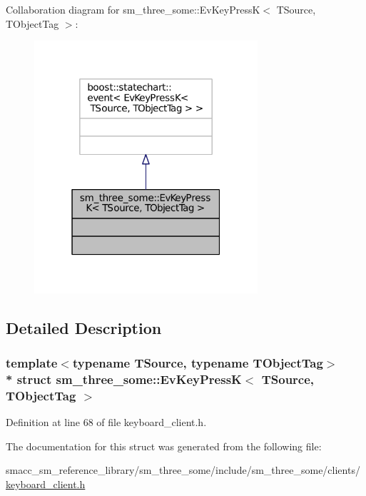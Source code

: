 Collaboration diagram for sm\+\_\+three\+\_\+some\+:\+:Ev\+Key\+PressK$<$ T\+Source, T\+Object\+Tag $>$\+:
\nopagebreak
\begin{figure}[H]
\begin{center}
\leavevmode
\includegraphics[width=235pt]{structsm__three__some_1_1EvKeyPressK__coll__graph}
\end{center}
\end{figure}


\subsection{Detailed Description}
\subsubsection*{template$<$typename T\+Source, typename T\+Object\+Tag$>$\\*
struct sm\+\_\+three\+\_\+some\+::\+Ev\+Key\+Press\+K$<$ T\+Source, T\+Object\+Tag $>$}



Definition at line 68 of file keyboard\+\_\+client.\+h.



The documentation for this struct was generated from the following file\+:\begin{DoxyCompactItemize}
\item 
smacc\+\_\+sm\+\_\+reference\+\_\+library/sm\+\_\+three\+\_\+some/include/sm\+\_\+three\+\_\+some/clients/\hyperlink{keyboard__client_8h}{keyboard\+\_\+client.\+h}\end{DoxyCompactItemize}
